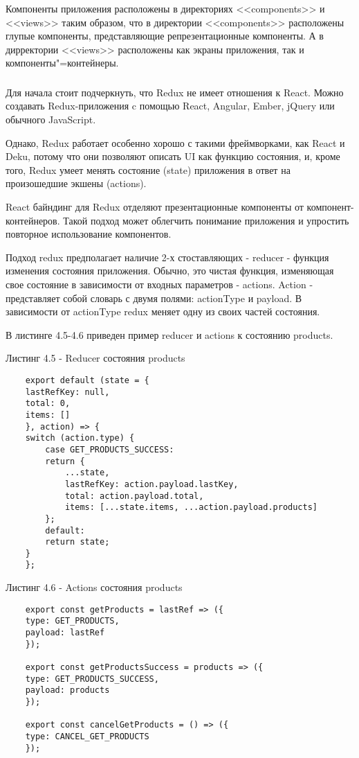 Компоненты приложения расположены в директориях <<components>> и <<views>> таким образом, что в директории <<components>> расположены глупые компоненты, представляющие репрезентационные компоненты.
А в дирректории <<views>> расположены как экраны приложения, так и компоненты"=контейнеры.


\subsubsection{}

Для начала стоит подчеркнуть, что Redux не имеет отношения к React.
Можно создавать Redux-приложения c помощью React, Angular, Ember, jQuery или обычного JavaScript.

Однако, Redux работает особенно хорошо с такими фреймворками, как React и Deku, потому что они позволяют описать UI как функцию состояния, и, кроме того, Redux умеет менять состояние (state) приложения в ответ на произошедшие экшены (actions).

React байндинг для Redux отделяют презентационные компоненты от компонент-контейнеров.
Такой подход может облегчить понимание приложения и упростить повторное использование компонентов.

Подход redux предполагает наличие 2-х стоставляющих - reducer - функция изменения состояния приложения.
Обычно, это чистая функция, изменяющая свое состояние в зависимости от входных параметров - actions.
Action - представляет собой словарь с двумя полями: actionType  и payload.
В зависимости от actionType redux меняет одну из своих частей состояния.

В листинге 4.5-4.6 приведен пример reducer и actions к состоянию products.

Листинг 4.5 - Reducer состояния products
\begin{lstlisting}
    export default (state = {
    lastRefKey: null,
    total: 0,
    items: []
    }, action) => {
    switch (action.type) {
        case GET_PRODUCTS_SUCCESS:
        return {
            ...state,
            lastRefKey: action.payload.lastKey,
            total: action.payload.total,
            items: [...state.items, ...action.payload.products]
        };
        default:
        return state;
    }
    };
\end{lstlisting}

Листинг 4.6 - Actions состояния products
\begin{lstlisting}
    export const getProducts = lastRef => ({
    type: GET_PRODUCTS,
    payload: lastRef
    });

    export const getProductsSuccess = products => ({
    type: GET_PRODUCTS_SUCCESS,
    payload: products
    });

    export const cancelGetProducts = () => ({
    type: CANCEL_GET_PRODUCTS
    });

\end{lstlisting}

